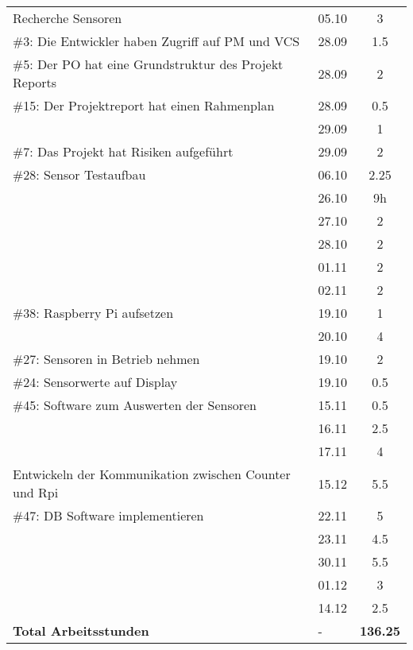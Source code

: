\documentclass[a4paper, 10pt, fleqn]{article}
\newcommand{\footer}{\midrule\textbf{Total Arbeitsstunden}&-&\textbf{136.25}\\\midrule\bottomrule}
\begin{document}
\begin{longtable}{p{9cm}|p{2cm}|c}
        Recherche Sensoren & 05.10 & 3\\
        \#3: Die Entwickler haben Zugriff auf PM und VCS& 28.09 & 1.5\\
        \#5: Der PO hat eine Grundstruktur des Projekt Reports& 28.09 & 2\\
        \#15: Der Projektreport hat einen Rahmenplan & 28.09 & 0.5\\
        & 29.09 & 1\\
        \#7: Das Projekt hat Risiken aufgeführt & 29.09 & 2\\
        \#28: Sensor Testaufbau & 06.10 & 2.25\\
        & 26.10 & 9h \\
        & 27.10 & 2\\
        & 28.10 & 2\\
        & 01.11 & 2\\
        & 02.11 & 2\\
        \#38: Raspberry Pi aufsetzen & 19.10 & 1\\
        & 20.10 & 4\\
        \#27: Sensoren in Betrieb nehmen & 19.10 & 2\\
        \#24: Sensorwerte auf Display & 19.10 & 0.5\\
        \#45: Software zum Auswerten der Sensoren & 15.11 & 0.5\\
        & 16.11 & 2.5\\
        & 17.11 & 4\\
        Entwickeln der Kommunikation zwischen Counter und Rpi & 15.12 & 5.5\\
        \#47: DB Software implementieren & 22.11 & 5\\
        & 23.11 & 4.5\\
        & 30.11 & 5.5\\
        & 01.12 & 3\\
        & 14.12 & 2.5\\
        \footer
	\end{longtable}
\end{document}
